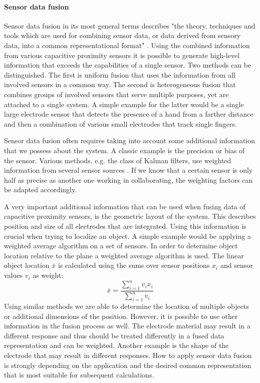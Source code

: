 \paragraph{Sensor data fusion}
Sensor data fusion in its most general terms describes "the theory, techniques and tools which are used for combining sensor data, or data derived from sensory data, into a common representational format" \cite{mitchell2007introduction}. Using the combined information from various capacitive proximity sensors it is possible to generate high-level information that exceeds the capabilities of a single sensor. Two methods can be  distinguished. The first is uniform fusion that uses the information from all involved sensors in a common way. The second is heterogeneous fusion that combines groups of involved sensors that serve multiple purposes, yet are attached to a single system. A simple example for the latter would be a single large electrode sensor that detects the presence of a hand from a farther distance and then a combination of various small electrodes that track single fingers. 

Sensor data fusion often requires taking into account some additional information that we possess about the system. A classic example is the precision or bias of the sensor. Various methods, e.g. the class of Kalman filters, use weighted information from several sensor sources \cite{welch1995introduction}. If we know that a certain sensor is only half as precise as another one working in collaborating, the weighting factors can be adapted accordingly. 

A very important additional information that can be used when fusing data of capacitive proximity sensors, is the geometric layout of the system. This describes position and size of all electrodes that are integrated. Using this information is crucial when trying to localize an object. A simple example would be applying a weighted average algorithm on a set of sensors. In order to determine object location relative to the plane a weighted average algorithm is used. The linear object location $\overline{x}$ is calculated using the sums over sensor positions $x_i$ and sensor values $v_i$ as weight:
\begin{equation}
\overline{x}=\frac{\sum^n_{i=1}{v_i x_i}}{\sum^n_{i=1}{v_i}}
\end{equation}
Using similar methods we are able to determine the location of multiple objects or additional dimensions of the position. However, it is possible to use other information in the fusion process as well. The electrode material may result in a different response and thus should be treated differently in a fused data representation and can be weighted. Another example is the shape of the electrode that may result in different responses. How to apply sensor data fusion is strongly depending on the application and the desired common representation that is most suitable for subsequent calculations.

